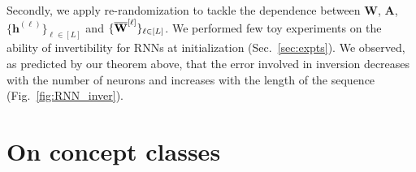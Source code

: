Secondly, we apply re-randomization to tackle the dependence between $\mathbf{W}$, $\mathbf{A}$, $\{\mathbf{h}^{(\ell)}\}_{\ell \in [L]}$ and $\{\overline{\mathbf{W}}^{[\ell]}\}_{\ell \in [L]}$.
We performed few toy experiments on the ability of invertibility for  RNNs at initialization (Sec.~\ref{sec:expts}). We observed, as predicted by our theorem above, that the error involved in inversion decreases with the number of neurons and increases with the length of the sequence (Fig.~\ref{fig:RNN_inver}). 



%    


%    

%    

%    



\section{On concept classes}

